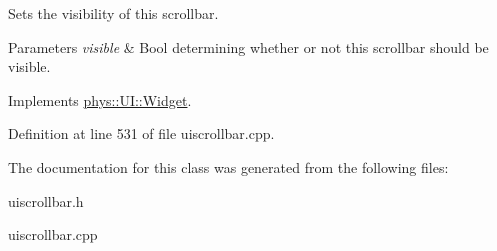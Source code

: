 Sets the visibility of this scrollbar. 


\begin{DoxyParams}{Parameters}
{\em visible} & Bool determining whether or not this scrollbar should be visible. \\
\hline
\end{DoxyParams}


Implements \hyperlink{classphys_1_1UI_1_1Widget_ab049233d8d5522a6ab42654b8924a3e0}{phys::UI::Widget}.



Definition at line 531 of file uiscrollbar.cpp.



The documentation for this class was generated from the following files:\begin{DoxyCompactItemize}
\item 
uiscrollbar.h\item 
uiscrollbar.cpp\end{DoxyCompactItemize}
